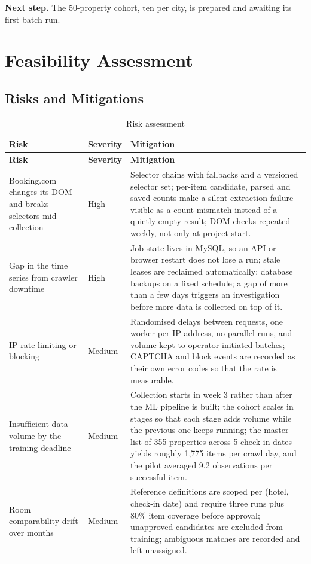 \textbf{Next step.} The 50-property cohort, ten per city, is prepared and awaiting its first batch run.

\section{Feasibility Assessment}

\subsection{Risks and Mitigations}

\begin{longtable}{|p{3.5cm}|p{1.7cm}|p{9.0cm}|}
\caption{Risk assessment}
\label{tab:risks} \\
\hline
\textbf{Risk} & \textbf{Severity} & \textbf{Mitigation} \\
\hline
\endfirsthead
\hline
\textbf{Risk} & \textbf{Severity} & \textbf{Mitigation} \\
\hline
\endhead
\hline
\endfoot
\hline
\endlastfoot
Booking.com changes its DOM and breaks selectors mid-collection & High & Selector chains with fallbacks and a versioned selector set; per-item candidate, parsed and saved counts make a silent extraction failure visible as a count mismatch instead of a quietly empty result; DOM checks repeated weekly, not only at project start. \\
\hline
Gap in the time series from crawler downtime & High & Job state lives in MySQL, so an API or browser restart does not lose a run; stale leases are reclaimed automatically; database backups on a fixed schedule; a gap of more than a few days triggers an investigation before more data is collected on top of it. \\
\hline
IP rate limiting or blocking & Medium & Randomised delays between requests, one worker per IP address, no parallel runs, and volume kept to operator-initiated batches; CAPTCHA and block events are recorded as their own error codes so that the rate is measurable. \\
\hline
Insufficient data volume by the training deadline & Medium & Collection starts in week 3 rather than after the ML pipeline is built; the cohort scales in stages so that each stage adds volume while the previous one keeps running; the master list of 355 properties across 5 check-in dates yields roughly 1{,}775 items per crawl day, and the pilot averaged 9.2 observations per successful item. \\
\hline
Room comparability drift over months & Medium & Reference definitions are scoped per (hotel, check-in date) and require three runs plus 80\% item coverage before approval; unapproved candidates are excluded from training; ambiguous matches are recorded and left unassigned. \\

\end{longtable}
